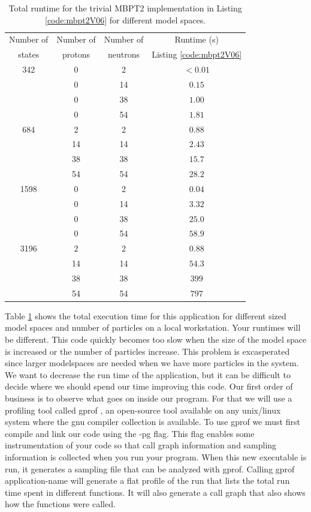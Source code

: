 \begin{table}
\caption{Total runtime for the trivial MBPT2 implementation in Listing 
    \ref{code:mbpt2V06} for different model spaces.}\label{tab:mbpt2V06_runtime}
  \begin{center}
      \begin{tabular}{cccc}
      \hline
      Number of & Number of & Number of & Runtime (s) \\
      states & protons & neutrons & Listing \ref{code:mbpt2V06}\\
      \hline
      \hline
        342 & 0 & 2 & $< 0.01$ \\
         & 0 & 14 & $0.15$ \\
         & 0 & 38 & $1.00$ \\
         & 0 & 54 & $1.81$ \\
         684 & 2 & 2 & $0.88$ \\
         & 14 & 14 & $2.43$ \\
         & 38 & 38 & $15.7$ \\
         & 54 & 54 & $28.2$ \\
         1598 & 0 & 2 & $0.04$ \\
         & 0 & 14 & $3.32$ \\
         & 0 & 38 & $25.0$ \\
         & 0 & 54 & $58.9$ \\
         3196 & 2 & 2 & $0.88$ \\
         & 14 & 14 & $54.3$ \\
         & 38 & 38 & $399$ \\
         & 54 & 54 & $797$ \\
      \hline
      \end{tabular}
  \end{center}
\end{table}

Table \ref{tab:mbpt2V06_runtime} shows the total execution time for this
application for different sized model spaces and number of particles on a local
workstation. Your runtimes will be different. This code
quickly becomes too slow when the size of the model space is increased or the
number of particles increase. This problem is excasperated since larger
modelspaces are needed when we have more particles in the system.
We want to decrease the run time of the application, but it can be difficult to
decide where we should spend our time improving this code. Our first order of
business is to observe what goes on inside our program. For that we will use a
profiling tool called gprof \cite{refneeded}, an open-source tool available on any
unix/linux system where the gnu compiler collection is available. To use gprof
we must first compile and link our code using the -pg flag. This flag enables
some instrumentation of your code so that call graph information and sampling
information is collected when you run your program. When this new
executable is run, it generates a sampling file that can be analyzed with gprof.
Calling gprof application-name will generate a flat profile of the run that
lists the total run time spent in different functions. It will also generate a
call graph that also shows how the functions were called. 


